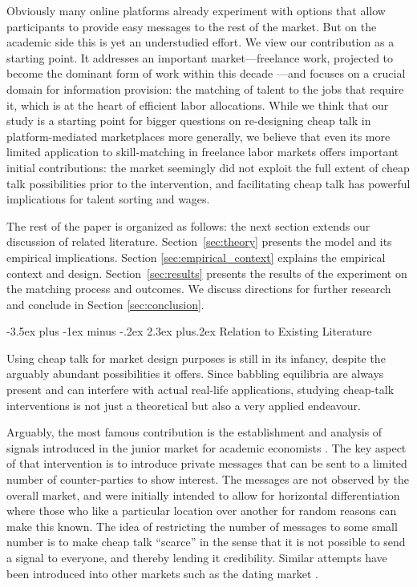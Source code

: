 \documentclass[12pt]{article}
\makeatletter
\renewcommand{\section}{%
  \@startsection{section}{1}{\z@}%
  {-3.5ex plus -1ex minus -.2ex}%
  {2.3ex plus.2ex}%
  {\normalfont\Large\bfseries}%
}
\makeatother
\begin{document}
Obviously many online platforms already experiment with options that allow participants to provide easy messages to the rest of the market. But on the academic side this is yet an understudied effort. We view our contribution as a starting point. It addresses an important market---freelance work, projected to become the dominant form of work within this decade \citep{Upwork2017}---and focuses on a crucial domain for information provision: the matching of talent to the jobs that require it, which is at the heart of efficient labor allocations. While we think that our study is a starting point for bigger questions on re-designing cheap talk in platform-mediated marketplaces more generally, we believe that even its more limited application to skill-matching in freelance labor markets offers important initial contributions: the market seemingly did not exploit the full extent of cheap talk possibilities prior to the intervention, and facilitating cheap talk has powerful implications for talent sorting and wages. 

The rest of the paper is organized as follows:
the next section extends our discussion of related literature. Section~\ref{sec:theory} presents the model and its empirical implications.
Section \ref{sec:empirical_context} explains the empirical context and design.
Section~\ref{sec:results} presents the results of the
experiment on the matching process and outcomes. 
We discuss directions for further research and conclude in Section \ref{sec:conclusion}.

\section{Relation to Existing Literature}\label{sec:literature}

Using cheap talk for market design purposes is still in its infancy, despite the arguably abundant possibilities it offers. Since babbling equilibria are always present and can interfere with actual real-life applications, studying cheap-talk interventions is not just a theoretical but also a very applied endeavour. 

Arguably, the most famous contribution is the establishment and analysis of signals introduced in the junior market for academic economists \citep{coles2013preference, kushnir2013harmful}. The key aspect of that intervention is to introduce private messages that can be sent to a limited number of counter-parties to show interest. The messages are not observed by the overall market, and were initially intended to allow for horizontal differentiation where those who like a particular location over another for random reasons can make this known. The idea of restricting the number of messages to some small number is to make cheap talk ``scarce'' in the sense that it is not possible to send a signal to everyone, and thereby lending it credibility. Similar attempts have been introduced into other markets such as the dating market \citep{lee2011propose}.
 
\end{document}

